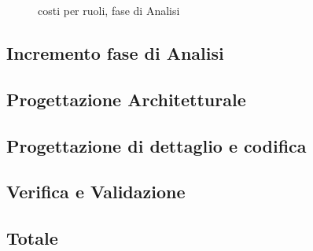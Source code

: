 \begin{figure}[H]
\centering
{}
\caption{costi per ruoli, fase di Analisi}
\end{figure}
\subsection{Incremento fase di Analisi}
\subsection{Progettazione Architetturale}
\subsection{Progettazione di dettaglio e codifica}
\subsection{Verifica e Validazione}
\subsection{Totale}





